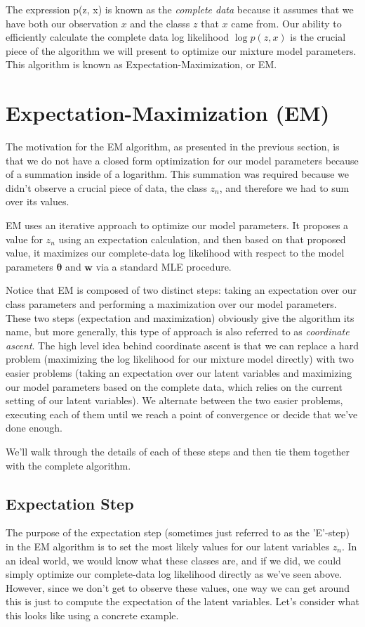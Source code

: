 The expression p(z, x) is known as the \textit{complete data} because it assumes that we have both our observation $x$ and the classs $z$ that $x$ came from. Our ability to efficiently calculate the complete data log likelihood $\log p(z, x)$ is the crucial piece of the algorithm we will present to optimize our mixture model parameters. This algorithm is known as Expectation-Maximization, or EM.

\section{Expectation-Maximization (EM)}
The motivation for the EM algorithm, as presented in the previous section, is that we do not have a closed form optimization for our model parameters because of a summation inside of a logarithm. This summation was required because we didn't observe a crucial piece of data, the class $z_{n}$, and therefore we had to sum over its values.

EM uses an iterative approach to optimize our model parameters. It proposes a value for $z_{n}$ using an expectation calculation, and then based on that proposed value, it maximizes our complete-data log likelihood with respect to the model parameters $\boldsymbol{\theta}$ and $\textbf{w}$ via a standard MLE procedure.

Notice that EM is composed of two distinct steps: taking an expectation over our class parameters and performing a maximization over our model parameters. These two steps (expectation and maximization) obviously give the algorithm its name, but more generally, this type of approach is also referred to as \textit{coordinate ascent}. The high level idea behind coordinate ascent is that we can replace a hard problem (maximizing the log likelihood for our mixture model directly) with two easier problems (taking an expectation over our latent variables and maximizing our model parameters based on the complete data, which relies on the current setting of our latent variables). We alternate between the two easier problems, executing each of them until we reach a point of convergence or decide that we've done enough.

We'll walk through the details of each of these steps and then tie them together with the complete algorithm.

\subsection{Expectation Step}
The purpose of the expectation step (sometimes just referred to as the 'E'-step) in the EM algorithm is to set the most likely values for our latent variables $z_n$. In an ideal world, we would know what these classes are, and if we did, we could simply optimize our complete-data log likelihood directly as we've seen above. However, since we don't get to observe these values, one way we can get around this is just to compute the expectation of the latent variables. Let's consider what this looks like using a concrete example.

